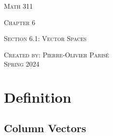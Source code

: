\documentclass[20pt,a4paper]{extarticle}
\begin{document}
\thispagestyle{empty}

\begin{center}
\vspace*{0.75cm}

{\Huge \textsc{Math 311}}

\vspace*{1.5cm}

{\LARGE \textsc{Chapter 6}} 

\vspace*{0.75cm}

\noindent\textsc{Section 6.1: Vector Spaces}

\vspace*{0.25cm}

\tableofcontents

\vfill

\noindent \textsc{Created by: Pierre-Olivier Paris{\'e}} \\
\textsc{Spring 2024}
\end{center}

\newpage

\section{Definition}

\subsection{Column Vectors}
\end{document}
